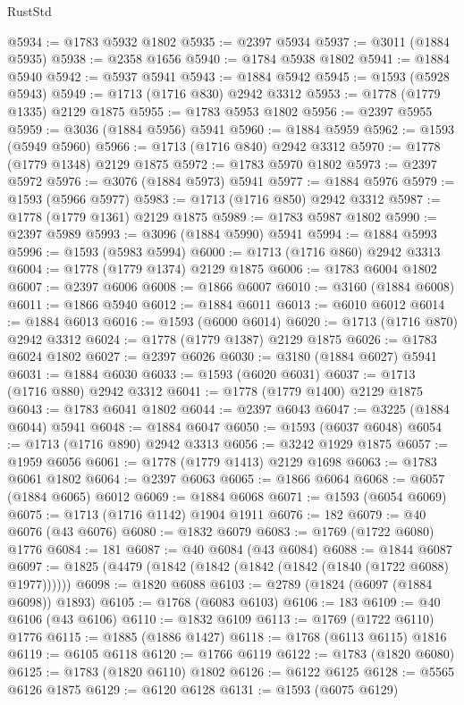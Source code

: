 \begin{lexlean}{RustStd}
\begin{coremodule}
@5934 := @1783 @5932 @1802
@5935 := @2397 @5934
@5937 := @3011 (@1884 @5935)
@5938 := @2358 @1656
@5940 := @1784 @5938 @1802
@5941 := @1884 @5940
@5942 := @5937 @5941
@5943 := @1884 @5942
@5945 := @1593 (@5928 @5943)
@5949 := @1713 (@1716 @830) @2942 @3312
@5953 := @1778 (@1779 @1335) @2129 @1875
@5955 := @1783 @5953 @1802
@5956 := @2397 @5955
@5959 := @3036 (@1884 @5956) @5941
@5960 := @1884 @5959
@5962 := @1593 (@5949 @5960)
@5966 := @1713 (@1716 @840) @2942 @3312
@5970 := @1778 (@1779 @1348) @2129 @1875
@5972 := @1783 @5970 @1802
@5973 := @2397 @5972
@5976 := @3076 (@1884 @5973) @5941
@5977 := @1884 @5976
@5979 := @1593 (@5966 @5977)
@5983 := @1713 (@1716 @850) @2942 @3312
@5987 := @1778 (@1779 @1361) @2129 @1875
@5989 := @1783 @5987 @1802
@5990 := @2397 @5989
@5993 := @3096 (@1884 @5990) @5941
@5994 := @1884 @5993
@5996 := @1593 (@5983 @5994)
@6000 := @1713 (@1716 @860) @2942 @3313
@6004 := @1778 (@1779 @1374) @2129 @1875
@6006 := @1783 @6004 @1802
@6007 := @2397 @6006
@6008 := @1866 @6007
@6010 := @3160 (@1884 @6008)
@6011 := @1866 @5940
@6012 := @1884 @6011
@6013 := @6010 @6012
@6014 := @1884 @6013
@6016 := @1593 (@6000 @6014)
@6020 := @1713 (@1716 @870) @2942 @3312
@6024 := @1778 (@1779 @1387) @2129 @1875
@6026 := @1783 @6024 @1802
@6027 := @2397 @6026
@6030 := @3180 (@1884 @6027) @5941
@6031 := @1884 @6030
@6033 := @1593 (@6020 @6031)
@6037 := @1713 (@1716 @880) @2942 @3312
@6041 := @1778 (@1779 @1400) @2129 @1875
@6043 := @1783 @6041 @1802
@6044 := @2397 @6043
@6047 := @3225 (@1884 @6044) @5941
@6048 := @1884 @6047
@6050 := @1593 (@6037 @6048)
@6054 := @1713 (@1716 @890) @2942 @3313
@6056 := @3242 @1929 @1875
@6057 := @1959 @6056
@6061 := @1778 (@1779 @1413) @2129 @1698
@6063 := @1783 @6061 @1802
@6064 := @2397 @6063
@6065 := @1866 @6064
@6068 := @6057 (@1884 @6065) @6012
@6069 := @1884 @6068
@6071 := @1593 (@6054 @6069)
@6075 := @1713 (@1716 @1142) @1904 @1911
@6076 := 182
@6079 := @40 @6076 (@43 @6076)
@6080 := @1832 @6079
@6083 := @1769 (@1722 @6080) @1776
@6084 := 181
@6087 := @40 @6084 (@43 @6084)
@6088 := @1844 @6087
@6097 := @1825 (@4479 (@1842 (@1842 (@1842 (@1842 (@1840 (@1722 @6088) @1977))))))
@6098 := @1820 @6088
@6103 := @2789 (@1824 (@6097 (@1884 @6098)) @1893)
@6105 := @1768 (@6083 @6103)
@6106 := 183
@6109 := @40 @6106 (@43 @6106)
@6110 := @1832 @6109
@6113 := @1769 (@1722 @6110) @1776
@6115 := @1885 (@1886 @1427)
@6118 := @1768 (@6113 @6115) @1816
@6119 := @6105 @6118
@6120 := @1766 @6119
@6122 := @1783 (@1820 @6080)
@6125 := @1783 (@1820 @6110) @1802
@6126 := @6122 @6125
@6128 := @5565 @6126 @1875
@6129 := @6120 @6128
@6131 := @1593 (@6075 @6129)

\end{coremodule}
\end{lexlean}
